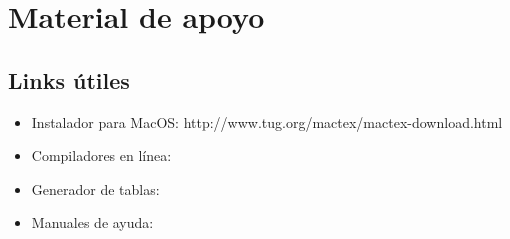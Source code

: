 \documentclass[12pt]{report}
\begin{document}
\newpage
\chapter{Material de apoyo}
\section{Links útiles}
\begin{itemize}
\item Instalador para MacOS:
http://www.tug.org/mactex/mactex-download.html
\item Compiladores en línea:
\item Generador de tablas:
\item Manuales de ayuda:
\end{itemize}


\newpage



\end{document}
